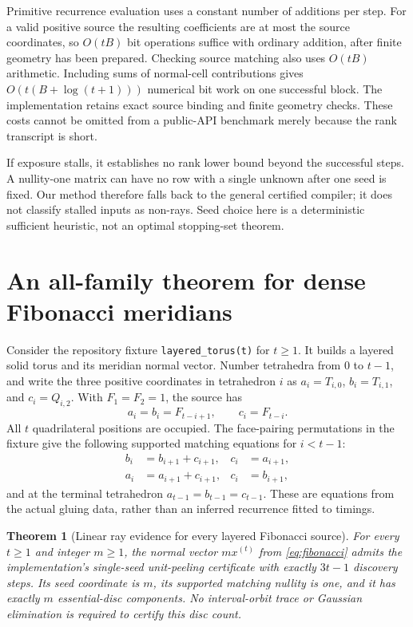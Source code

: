 \documentclass[11pt,a4paper]{article}
\newtheorem{theorem}{Theorem}[section]
\theoremstyle{definition}
\newcommand{\code}[1]{{\small\nolinkurl{#1}}}
\begin{document}
Primitive recurrence evaluation uses a constant number of additions per
step.  For a valid positive source the resulting coefficients are at most
the source coordinates, so $O(tB)$ bit operations suffice with ordinary
addition, after finite geometry has been prepared.  Checking source matching
also uses $O(tB)$ arithmetic.  Including sums of normal-cell contributions
gives $O(t(B+\log(t+1)))$ numerical bit work on one successful block.
The implementation retains exact source
binding and finite geometry checks.  These costs cannot be omitted from a
public-API benchmark merely because the rank transcript is short.

If exposure stalls, it establishes no rank lower bound beyond the successful
steps.  A nullity-one matrix can have no row with a single unknown after one
seed is fixed.  Our method therefore falls back to the general certified
compiler; it does not classify stalled inputs as non-rays.  Seed choice here
is a deterministic sufficient heuristic, not an optimal stopping-set theorem.

\section{An all-family theorem for dense Fibonacci meridians}
\label{sec:fibonacci}

Consider the repository fixture \code{layered_torus(t)} for $t\ge1$.  It
builds a layered solid torus and its meridian normal vector.  Number tetrahedra
from $0$ to $t-1$, and write the three positive coordinates in tetrahedron $i$
as $a_i=T_{i,0}$, $b_i=T_{i,1}$, and $c_i=Q_{i,2}$.  With $F_1=F_2=1$,
the source has
\begin{equation}
 a_i=b_i=F_{t-i+1},\qquad c_i=F_{t-i}.          \label{eq:fibonacci}
\end{equation}
All $t$ quadrilateral positions are occupied.  The face-pairing permutations
in the fixture give the following supported matching equations for $i<t-1$:
\begin{align}
 b_i&=b_{i+1}+c_{i+1}, & c_i&=a_{i+1},\\
 a_i&=a_{i+1}+c_{i+1}, & c_i&=b_{i+1},         \label{eq:fibrows}
\end{align}
and at the terminal tetrahedron $a_{t-1}=b_{t-1}=c_{t-1}$.  These are equations
from the actual gluing data, rather than an inferred recurrence fitted to
timings.

\begin{theorem}[Linear ray evidence for every layered Fibonacci source]
\label{thm:fibonacci}
For every $t\ge1$ and integer $m\ge1$, the normal vector $m x^{(t)}$ from
\cref{eq:fibonacci} admits the implementation's single-seed unit-peeling
certificate with exactly $3t-1$ discovery steps.  Its seed coordinate is $m$,
its supported matching nullity is one, and it has exactly $m$ essential-disc
components.  No interval-orbit trace or Gaussian elimination is required to
certify this disc count.
\end{theorem}
\end{document}

